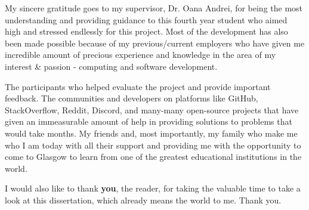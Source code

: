\documentclass{l4proj}
\begin{document}

\begin{acknowledgements}
    My sincere gratitude goes to my supervisor, Dr. Oana Andrei, for being the most understanding and providing guidance to this fourth year student who aimed high and stressed endlessly for this project. Most of the development has also been made possible because of my previous/current employers who have given me incredible amount of precious experience and knowledge in the area of my interest \& passion - computing and software development.

    The participants who helped evaluate the project and provide important feedback. The communities and developers on platforms like GitHub, StackOverflow, Reddit, Discord, and many-many open-source projects that have given an immeasurable amount of help in providing solutions to problems that would take months. My friends and, most importantly, my family who make me who I am today with all their support and providing me with the opportunity to come to Glasgow to learn from one of the greatest educational institutions in the world.

    I would also like to thank \textbf{you}, the reader, for taking the valuable time to take a look at this dissertation, which already means the world to me. Thank you.
\end{acknowledgements}

%
%

\def\consentname {Inesh Bose} %
\def\consentdate {1 April 2022} %
%
\educationalconsent


\tableofcontents

\newpage
\listoffigures
\listoftables
\end{document}
